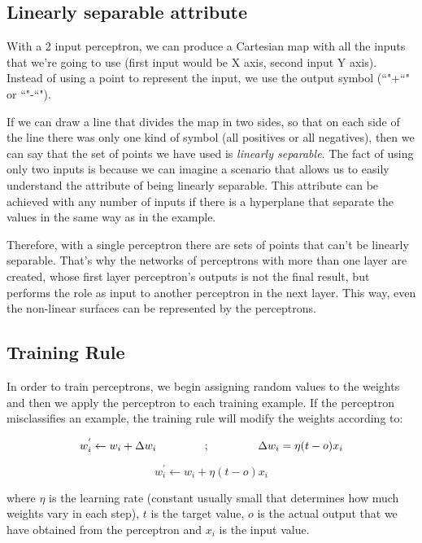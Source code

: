 	\subsection{Linearly separable attribute}
	With a 2 input perceptron, we can produce a Cartesian map with all the inputs that we're going to use (first input would be X axis, second input Y axis). Instead of using a point to represent the input, we use the output symbol (``"+``" or ``"-``").

	If we can draw a line that divides the map in two sides, so that on each side of the line there was only one kind of symbol (all positives or all negatives), then we can say that the set of points we have used is \textit{linearly separable}. The fact of using only two inputs is because we can imagine a scenario that allows us to easily understand the attribute of being linearly separable. This attribute can be achieved with any number of inputs if there is a hyperplane that separate the values in the same way as in the example.
	
	Therefore, with a single perceptron there are sets of points that can't be linearly separable. That's why the networks of perceptrons with more than one layer are created, whose first layer perceptron's outputs is not the final result, but performs the role as input to another perceptron in the next layer. This way, even the non-linear surfaces can be represented by the perceptrons.

	\subsection{Training Rule}
	In order to train perceptrons, we begin assigning random values to the weights and then we apply the perceptron to each training example. If the perceptron misclassifies an example, the training rule will modify the weights according to:

	\begin{equation*}
		\label{training_rule_proccess}
		w_{i}^{'} \leftarrow w_{i} + \Delta w_{i} \hspace{1.5cm} ; \hspace{1.5cm} \Delta w_{i}= \eta (t - o) x_{i}
	\end{equation*}
	
	\begin{equation}
		\label{training_rule}
		w_{i}^{'} \leftarrow w_{i} + \eta (t - o) x_{i}
	\end{equation}

	where $\eta$ is the learning rate (constant usually small that determines how much weights vary in each step), $t$ is the target value, $o$ is the actual output that we have obtained from the perceptron and $x_{i}$ is the input value.

